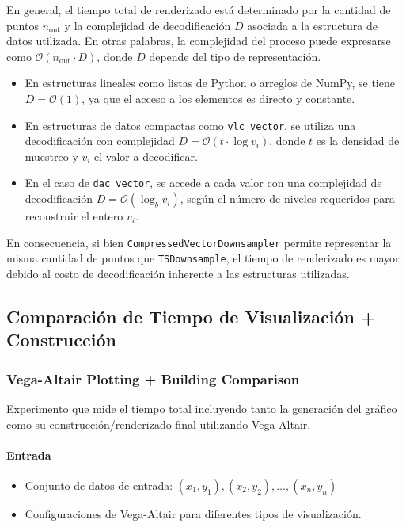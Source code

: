 En general, el tiempo total de renderizado está determinado por la cantidad de puntos \(n_{\text{out}}\) y la complejidad de decodificación \(D\) asociada a la estructura de datos utilizada. En otras palabras, la complejidad del proceso puede expresarse como \(\mathcal{O}(n_{\text{out}} \cdot D)\), donde \(D\) depende del tipo de representación.

\begin{itemize}
    \item En estructuras lineales como listas de Python o arreglos de NumPy, se tiene \(D = \mathcal{O}(1)\), ya que el acceso a los elementos es directo y constante.
    
    \item En estructuras de datos compactas como \texttt{vlc\_vector}, se utiliza una decodificación con complejidad \(D = \mathcal{O}(t \cdot \log v_i)\), donde \(t\) es la densidad de muestreo y \(v_i\) el valor a decodificar.
    
    \item En el caso de \texttt{dac\_vector}, se accede a cada valor con una complejidad de decodificación \(D = \mathcal{O}(\log_b v_i)\), según el número de niveles requeridos para reconstruir el entero \(v_i\).
\end{itemize}

En consecuencia, si bien \texttt{CompressedVectorDownsampler} permite representar la misma cantidad de puntos que \texttt{TSDownsample}, el tiempo de renderizado es mayor debido al costo de decodificación inherente a las estructuras utilizadas. 




\newpage
\subsection{Comparación de Tiempo de Visualización + Construcción}
\subsubsection{Vega-Altair Plotting + Building Comparison}
\label{vega_altair_plot_plus_build_time}

Experimento que mide el tiempo total incluyendo tanto la generación del gráfico como su construcción/renderizado final utilizando Vega-Altair.

\paragraph{Entrada}
\begin{itemize}
    \item Conjunto de datos de entrada: \( (x_1, y_1), (x_2, y_2), \ldots, (x_n, y_n) \)
    \item Configuraciones de Vega-Altair para diferentes tipos de visualización.
\end{itemize}

